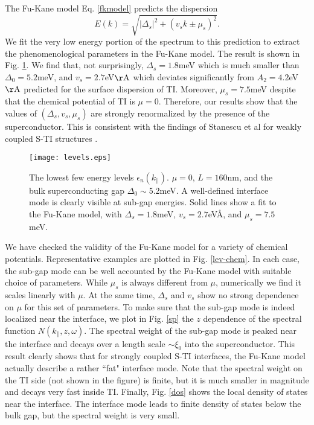 \documentclass[11pt,revtex,aps]{report}
\begin{document}
The Fu-Kane model Eq. \eqref{fkmodel} predicts the dispersion 
\begin{equation}
E(k)=\sqrt{|\Delta_s|^2+(v_sk \pm\mu_s)^2}.
\end{equation}
We fit the very low energy portion of the spectrum to this prediction to
extract the phenomenological parameters in the Fu-Kane model. The result
is shown in Fig. \ref{lev-fk}. We find that,
not surprisingly, $\Delta_s=1.8$meV which is much smaller than $\Delta_0=5.2$meV, and 
$v_s=2.7$eV$\mathrm{\AA}$ which deviates significantly 
from $A_2=4.2$eV$\mathrm{\AA}$ predicted for the surface 
dispersion of TI. Moreover, $\mu_s=7.5$meV despite that the chemical potential
of TI is $\mu=0$. Therefore, our results show that the values of $(\Delta_s,v_s,\mu_s)$
are strongly renormalized by the presence of the superconductor. This is consistent 
with the findings of Stanescu et al for weakly coupled S-TI structures \cite{stan}. 

\begin{figure}
\center
\texttt{[image: levels.eps]}
\caption{The lowest few energy levels $\epsilon_n(k_\parallel)$. 
$\mu=0$, $L=160$nm, and the bulk superconducting gap $\Delta_0\sim$5.2meV.
A well-defined interface mode is clearly visible at sub-gap energies.
Solid lines show a fit to the Fu-Kane model, with $\Delta_s=1.8$meV, 
$v_s=2.7$eV\AA, and $\mu_s=7.5$meV.
}\label{lev-fk}
\end{figure}

We have checked the validity of the Fu-Kane model for a variety of chemical potentials.
Representative examples are plotted in Fig. \ref{lev-chem}. In each case, the sub-gap 
mode can be well accounted by the Fu-Kane 
model with suitable choice of parameters. While $\mu_s$ is always different from $\mu$,
numerically we find it scales linearly with $\mu$. At the same time, 
$\Delta_s$ and $v_s$ show no strong dependence on $\mu$ for this set of parameters.
To make sure that the sub-gap mode is indeed localized near the interface, we plot in 
Fig. \ref{sp} the $z$ dependence of the spectral function $N(k_\parallel,z,\omega)$.
%
The spectral weight of the sub-gap mode is peaked near the interface and decays over 
a length scale $\sim \xi_0$ into the superconductor. This result clearly shows
that for strongly coupled S-TI interfaces, the Fu-Kane model actually describe a
rather ``fat" interface mode. Note that the spectral weight on the TI side 
(not shown in the figure) is finite, 
but it is much smaller in magnitude and decays very fast inside TI. Finally,
Fig. \ref{dos} shows the local density of states near the interface.
The interface mode leads to finite density of states below the bulk gap,
but the spectral weight is very small.
\end{document}
